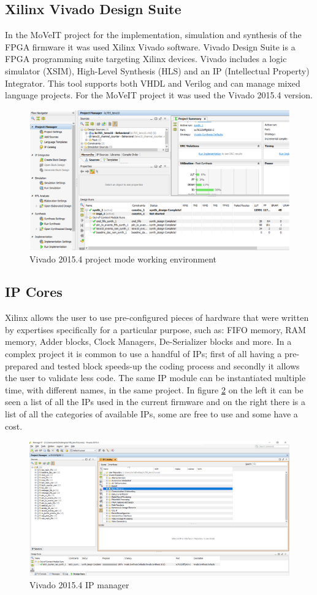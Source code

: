\subsection{Xilinx Vivado Design Suite}
\noindent In the MoVeIT project for the implementation, simulation and synthesis of the FPGA firmware it was used Xilinx Vivado software.
Vivado Design Suite is a FPGA programming suite targeting Xilinx devices.
Vivado includes a logic simulator (XSIM), High-Level Synthesis (HLS) and an IP (Intellectual Property) Integrator\cite{vivado}.
This tool supports both VHDL and Verilog and can manage mixed language projects.
For the MoVeIT project it was used the Vivado 2015.4 version. 
\begin{figure}[H]
	\centering
	\includegraphics[width=0.7\linewidth]{IMG/ch3/VIVADO}
	\caption{Vivado 2015.4 project mode working environment}
	\label{fig:vivado}
\end{figure}

\subsection{IP Cores}
\noindent Xilinx allows the user to use pre-configured pieces of hardware that were written by expertises specifically for a particular purpose, such as: FIFO memory, RAM memory, Adder blocks, Clock Managers, De-Serializer blocks and more.
In a complex project it is common to use a handful of IPs; first of all having a pre-prepared and tested block speeds-up the coding process and secondly it allows the user to validate less code. The same IP module can be instantiated multiple time, with different names, in the same project. In figure \ref{fig:ip}  on the left it can be seen a list of all the IPs used in the current firmware and on the right there is a list of all the categories of available IPs, some are free to use and some have a cost.
\begin{figure}[H]
	\centering
	\includegraphics[width=0.7\linewidth]{IMG/ch3/IP}
	\caption{Vivado 2015.4 IP manager}
	\label{fig:ip}
\end{figure} 

